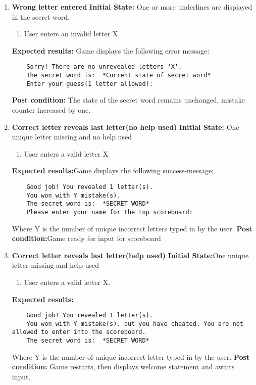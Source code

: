 \documentclass{article}
\begin{document}
\begin{enumerate}
	\item \textbf{Wrong letter entered}\newline
	\textbf{Initial State:} One or more underlines are displayed in the secret word.
	\begin{enumerate}
	\item User enters an invalid letter X.
	\end{enumerate}
	\textbf{Expected results:} Game displays the following error message: 
	\begin{verbatim}
	Sorry! There are no unrevealed letters 'X'. 
	The secret word is:  *Current state of secret word*
	Enter your guess(1 letter allowed):
	\end{verbatim}
	\textbf{Post condition:} The state of the secret word remains unchanged, mistake counter increased by one.

	\item \textbf{Correct letter reveals last letter(no help used)}\newline
	\textbf{Initial State:} One unique letter missing and no help used
	\begin{enumerate}
	\item User enters a valid letter X
	\end{enumerate}
	\textbf{Expected results:}Game displays the following success-message;
	\begin{verbatim}
	Good job! You revealed 1 letter(s).
	You won with Y mistake(s).
	The secret word is:  *SECRET WORD*
	Please enter your name for the top scoreboard:
	\end{verbatim}
	Where Y is the number of unique incorrect letters typed in by the user.\newline
	\textbf{Post condition:}Game ready for input for scoreboard\newline

	\item \textbf{Correct letter reveals last letter(help used)}\newline
	\textbf{Initial State:}One unique letter missing and help used
	\begin{enumerate}
	\item User enters a valid letter X.
	\end{enumerate}
	\textbf{Expected results:}
	\begin{verbatim}
	Good job! You revealed 1 letter(s).
	You won with Y mistake(s). but you have cheated. You are not allowed to enter into the scoreboard.
	The secret word is:  *SECRET WORD*
	\end{verbatim}
	Where Y is the number of unique incorrect letter typed in by the user.
	\textbf{Post condition:} Game restarts, then displays welcome statement and awaits input.\newline


\end{enumerate}
\end{document}
